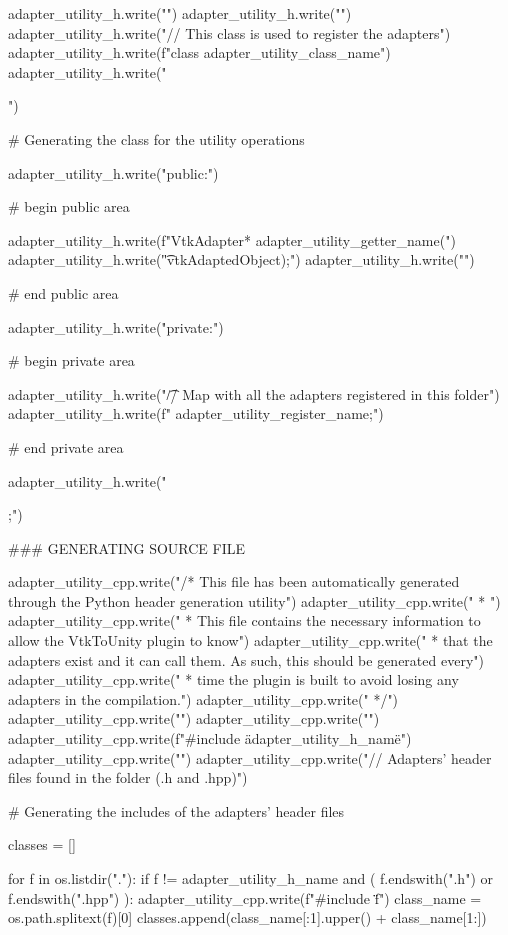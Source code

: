 \begin{appendices}
\begin{python}[label=lst:generateheader,caption={generate-header.py script},aboveskip=20pt]
adapter_utility_h.write("\n")
adapter_utility_h.write("\n")
adapter_utility_h.write("// This class is used to register the adapters\n")
adapter_utility_h.write(f"class {adapter_utility_class_name}\n")
adapter_utility_h.write("{\n")

# Generating the class for the utility operations

adapter_utility_h.write("public:\n")

# begin public area

adapter_utility_h.write(f"\tstatic VtkAdapter* {adapter_utility_getter_name}(\n")
adapter_utility_h.write("\t\tLPCSTR vtkAdaptedObject);\n")
adapter_utility_h.write("\n")

# end public area

adapter_utility_h.write("private:\n")

# begin private area

adapter_utility_h.write("\t// Map with all the adapters registered in this folder\n")
adapter_utility_h.write(f" {adapter_utility_register_name};\n")

# end private area

adapter_utility_h.write("};\n")



### GENERATING SOURCE FILE

adapter_utility_cpp.write("/* This file has been automatically generated through the Python header generation utility\n")
adapter_utility_cpp.write(" * \n")
adapter_utility_cpp.write(" * This file contains the necessary information to allow the VtkToUnity plugin to know\n")
adapter_utility_cpp.write(" * that the adapters exist and it can call them. As such, this should be generated every\n")
adapter_utility_cpp.write(" * time the plugin is built to avoid losing any adapters in the compilation.\n")
adapter_utility_cpp.write(" */\n")
adapter_utility_cpp.write("\n")
adapter_utility_cpp.write("\n")
adapter_utility_cpp.write(f"#include \"{adapter_utility_h_name}\"\n")
adapter_utility_cpp.write("\n")
adapter_utility_cpp.write("// Adapters' header files found in the folder (.h and .hpp)\n")

# Generating the includes of the adapters' header files

classes = []

for f in os.listdir("."):
    if f != adapter_utility_h_name and ( f.endswith(".h") or f.endswith(".hpp") ):
        adapter_utility_cpp.write(f"#include \"{f}\"\n")
        class_name = os.path.splitext(f)[0]
        classes.append(class_name[:1].upper() + class_name[1:])


\end{python}
\end{appendices}
